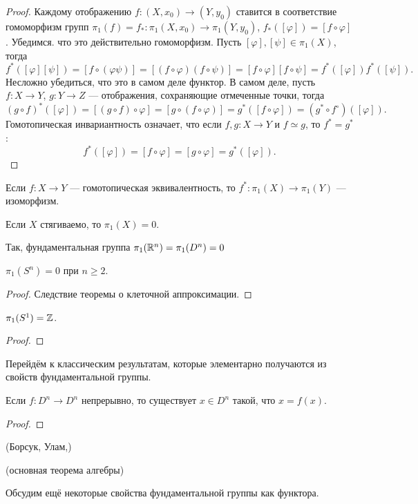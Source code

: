 \begin{proof}
Каждому отображению $f\colon(X,x_0)\to(Y,y_0)$ ставится в соответствие гомоморфизм групп $\pi_1(f)=f_*\colon\pi_1(X,x_0)\to\pi_1(Y,y_0)$, $f_*([\varphi])=[f\circ\varphi]$. Убедимся. что это действительно гомоморфизм. Пусть $[\varphi],[\psi]\in\pi_1(X)$, тогда
	\begin{equation*}
		f^*([\varphi][\psi])=[f\circ(\varphi\psi)]=[(f\circ\varphi)(f\circ\psi)]=[f\circ\varphi][f\circ\psi]=f^*([\varphi])f^*([\psi]).
	\end{equation*}
Несложно убедиться, что это в самом деле функтор. В самом деле, пусть $f\colon X\to Y$, $g\colon Y\to Z$ --- отображения, сохраняющие отмеченные точки, тогда
	\begin{equation*}
		(g\circ f)^*([\varphi])=[(g\circ f)\circ\varphi]=[g\circ(f\circ\varphi)]=g^*([f\circ\varphi])=(g^*\circ f^{\circ})([\varphi]).
	\end{equation*}
Гомотопическая инвариантность означает, что если $f,g\colon X\to Y$ и $f\simeq g$, то $f^*=g^*$:
	\begin{equation*}
		f^*([\varphi])=[f\circ\varphi]=[g\circ\varphi]=g^*([\varphi]).
	\end{equation*}
\end{proof}
\begin{cor}
	Если $f\colon X\to Y$ --- гомотопическая эквивалентность, то $f^*\colon\pi_1(X)\to\pi_1(Y)$ --- изоморфизм.
\end{cor}
\begin{cor}
	Если $X$ стягиваемо, то $\pi_1(X)=0$.
\end{cor}
Так, фундаментальная группа $\pi_1(\mathbb {R}^n)=\pi_1(D^n)=0$
\begin{prop}
	$\pi_1(S^n)=0$ при $n\geqslant 2$.
\end{prop}
\begin{proof}
	Следствие теоремы о клеточной аппроксимации.
\end{proof}
\begin{theorem}
	$\pi_1(S^1)=\mathbb {Z}$.
\end{theorem}
\begin{proof}

\end{proof}
Перейдём к классическим результатам, которые элементарно получаются из свойств фундаментальной группы.
\begin{theorem}[Брауэр, 1909]
	Если $f\colon D^n\to D^n$ непрерывно, то существует $x\in D^n$ такой, что $x=f(x)$.
\end{theorem}
\begin{proof}

\end{proof}
\begin{theorem}(Борсук, Улам,)

\end{theorem}
\begin{theorem}(основная теорема алгебры)

\end{theorem}
Обсудим ещё некоторые свойства фундаментальной группы как функтора.


